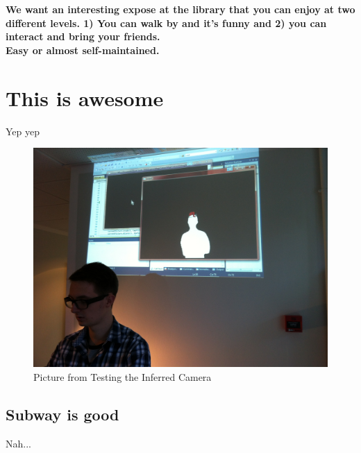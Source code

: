\textbf{We want an interesting expose at the library that you can enjoy at two different levels. 1) You can walk by and it's funny and 2) you can interact and bring your friends.}\\
\textbf{Easy or almost self-maintained.}

\section{This is awesome}
Yep yep

\begin{figure}[htbp]
\centering
\includegraphics[width=1.00\textwidth]{Pictures/Test/IMG_1477.jpg}
\caption{Picture from Testing the Inferred Camera}
\label{fig:Picture from Testing the Inferred Camera}
\end{figure}

\subsection{Subway is good}
Nah...